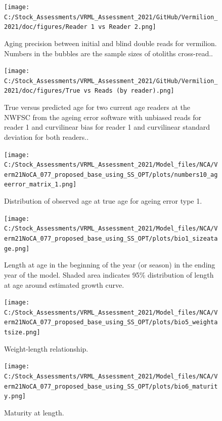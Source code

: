 \documentclass[11pt,
  english,
  a4paper,
]{article}
\begin{document}
\begin{figure}
\centering
\texttt{[image: C:/Stock\_Assessments/VRML\_Assessment\_2021/GitHub/Vermilion\_2021/doc/figures/Reader 1 vs Reader 2.png]}
\caption{Aging precision between initial and blind double reads for vermilion. Numbers in the bubbles are the sample sizes of otoliths cross-read..\label{fig:reader1reader2}}
\end{figure}

\begin{figure}
\centering
\texttt{[image: C:/Stock\_Assessments/VRML\_Assessment\_2021/GitHub/Vermilion\_2021/doc/figures/True vs Reads (by reader).png]}
\caption{True versus predicted age for two current age readers at the NWFSC from the ageing error software with unbiased reads for reader 1 and curvilinear bias for reader 1 and curvilinear standard deviation for both readers..\label{fig:truereads}}
\end{figure}

\begin{figure}
\centering
\texttt{[image: C:/Stock\_Assessments/VRML\_Assessment\_2021/Model\_files/NCA/Verm21NoCA\_077\_proposed\_base\_using\_SS\_OPT/plots/numbers10\_ageerror\_matrix\_1.png]}
\caption{Distribution of observed age at true age for ageing error type 1.\label{fig:ageerror}}
\end{figure}

\begin{figure}
\centering
\texttt{[image: C:/Stock\_Assessments/VRML\_Assessment\_2021/Model\_files/NCA/Verm21NoCA\_077\_proposed\_base\_using\_SS\_OPT/plots/bio1\_sizeatage.png]}
\caption{Length at age in the beginning of the year (or season) in the ending year of the model. Shaded area indicates 95\% distribution of length at age around estimated growth curve.\label{fig:fittedgrowth}}
\end{figure}

\begin{figure}
\centering
\texttt{[image: C:/Stock\_Assessments/VRML\_Assessment\_2021/Model\_files/NCA/Verm21NoCA\_077\_proposed\_base\_using\_SS\_OPT/plots/bio5\_weightatsize.png]}
\caption{Weight-length relationship.\label{fig:weightlength}}
\end{figure}

\begin{figure}
\centering
\texttt{[image: C:/Stock\_Assessments/VRML\_Assessment\_2021/Model\_files/NCA/Verm21NoCA\_077\_proposed\_base\_using\_SS\_OPT/plots/bio6\_maturity.png]}
\caption{Maturity at length.\label{fig:maturity}}
\end{figure}
\end{document}
